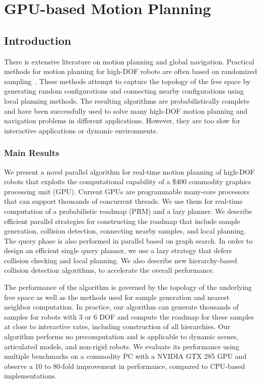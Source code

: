 \chapter{GPU-based Motion Planning} 
\label{chp:GPlanner}

\section{Introduction}
There is extensive literature on motion planning and global navigation. Practical methods for motion planning for high-DOF robots are often
based on randomized sampling~\cite{Kavraki96, Kuffner00}. These methods attempt to capture the topology of the free space
by generating random configurations and connecting nearby configurations using
local planning methods. The resulting algorithms are probabilistically complete and
have been successfully used to solve many high-DOF motion planning and
navigation problems in different applications. However, they are too slow for interactive applications or dynamic environments.


\subsection{Main Results}
We present a novel parallel algorithm
for real-time motion planning of high-DOF robots that exploits the computational capability of a \$400 commodity
graphics processing unit (GPU). Current GPUs are programmable many-core
processors that can support thousands of concurrent threads. We use
them for real-time computation of a probabilistic roadmap (PRM) and a lazy planner. We describe
efficient parallel strategies for constructing the roadmap that include
sample generation, collision detection, connecting nearby samples, and
local planning. The query phase is also performed in parallel based on graph search. In order to design an efficient single query planner, we use a lazy strategy that defers collision checking and local planning. We also describe new hierarchy-based collision detection algorithms, to accelerate the overall performance.

The performance of the algorithm is governed by the topology of the underlying
free space as well as the methods used for sample generation and nearest
neighbor computation. In practice, our algorithm can generate thousands of samples for
robots with 3 or 6 DOF and compute the roadmap for these samples at close to interactive rates, including construction of all hierarchies.
Our algorithm performs no precomputation and is applicable to dynamic scenes, articulated models, and non-rigid robots. We evaluate its
performance using multiple benchmarks on a commodity PC with a NVIDIA GTX 285 GPU and observe a 10 to 80-fold improvement in performance, compared to CPU-based implementations.

